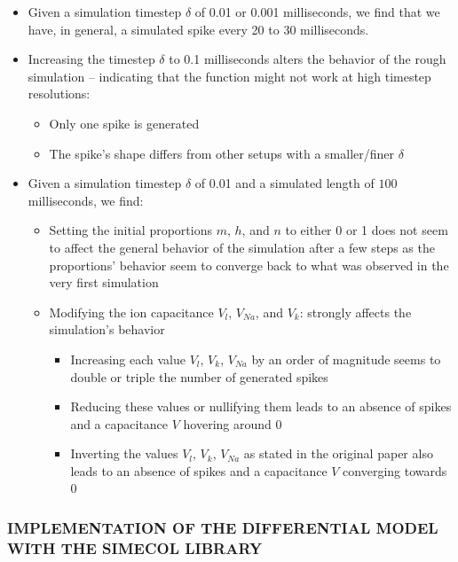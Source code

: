 \documentclass[
]{article}
\providecommand{\tightlist}{%
  \setlength{\itemsep}{0pt}\setlength{\parskip}{0pt}}
\begin{document}
\begin{itemize}
\tightlist
\item
  Given a simulation timestep \(\delta\) of 0.01 or 0.001 milliseconds,
  we find that we have, in general, a simulated spike every 20 to 30
  milliseconds.
\item
  Increasing the timestep \(\delta\) to 0.1 milliseconds alters the
  behavior of the rough simulation -- indicating that the function might
  not work at high timestep resolutions:

  \begin{itemize}
  \tightlist
  \item
    Only one spike is generated
  \item
    The spike's shape differs from other setups with a smaller/finer
    \(\delta\)
  \end{itemize}
\item
  Given a simulation timestep \(\delta\) of 0.01 and a simulated length
  of \(100\) milliseconds, we find:

  \begin{itemize}
  \tightlist
  \item
    Setting the initial proportions \(m\), \(h\), and \(n\) to either 0
    or 1 does not seem to affect the general behavior of the simulation
    after a few steps as the proportions' behavior seem to converge back
    to what was observed in the very first simulation
  \item
    Modifying the ion capacitance \(V_l\), \(V_{Na}\), and \(V_k\):
    strongly affects the simulation's behavior

    \begin{itemize}
    \tightlist
    \item
      Increasing each value \(V_l\), \(V_k\), \(V_{Na}\) by an order of
      magnitude seems to double or triple the number of generated spikes
    \item
      Reducing these values or nullifying them leads to an absence of
      spikes and a capacitance \(V\) hovering around 0
    \item
      Inverting the values \(V_l\), \(V_k\), \(V_{Na}\) as stated in the
      original paper also leads to an absence of spikes and a
      capacitance \(V\) converging towards 0
    \end{itemize}
  \end{itemize}
\end{itemize}

\hypertarget{implementation-of-the-differential-model-with-the-simecol-library}{%
\subsubsection{IMPLEMENTATION OF THE DIFFERENTIAL MODEL WITH THE SIMECOL
LIBRARY}\label{implementation-of-the-differential-model-with-the-simecol-library}}
\end{document}
